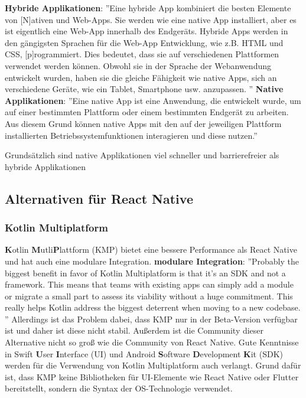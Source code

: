 \textbf{Hybride Applikationen}: ''Eine hybride App kombiniert die besten Elemente von [N]ativen und Web-Apps.
Sie werden wie eine native App installiert, aber es ist eigentlich
eine Web-App innerhalb des Endgeräts.
Hybride Apps werden in den gängigsten Sprachen für die Web-App Entwicklung, wie z.B. HTML und CSS, [p]rogrammiert. Dies bedeutet, dass sie auf verschiedenen Plattformen verwendet werden können.
Obwohl sie in der Sprache der Webanwendung entwickelt wurden, haben sie die gleiche Fähigkeit wie native Apps, sich an verschiedene Geräte, wie ein Tablet, Smartphone usw. anzupassen.
''\cite{native-vs-hybrid}
\newline
\textbf{Native Applikationen}: ''Eine native App ist eine Anwendung, die entwickelt wurde,
um auf einer bestimmten Plattform oder einem bestimmten Endgerät zu arbeiten.
Aus diesem Grund können native Apps mit den auf der jeweiligen Plattform
installierten Betriebssystemfunktionen interagieren und diese nutzen.''

\cite{native-vs-hybrid}



Grundsätzlich sind native Applikationen  viel schneller und barrierefreier als hybride Applikationen
\cite{native-vs-hybrid}



\subsection{Alternativen für React Native}

\subsubsection{Kotlin Multiplatform}
\textbf{K}otlin \textbf{M}utli\textbf{P}lattform (KMP) bietet eine bessere Performance als React Native und hat auch eine modulare Integration.
\newline
\textbf{modulare Integration}: ''Probably the biggest benefit in favor of Kotlin Multiplatform is that it’s
an SDK and not a framework. This means that teams with existing apps can
simply add a module or migrate a small part to assess its viability without
a huge commitment. This really helps Kotlin address the biggest deterrent
when moving to a new codebase.
''
\cite{kotlin-multiplatform-vs-react-native}
Allerdings ist das Problem dabei, dass KMP nur in der Beta-Version verfügbar ist und daher ist diese nicht stabil.
Außerdem  ist die Community dieser Alternative nicht so groß wie die Community von React Native.
Gute Kenntnisse in Swift \textbf{U}ser \textbf{I}nterface (UI) und Android \textbf{S}oftware \textbf{D}evelopment \textbf{K}it (SDK) werden für die Verwendung von Kotlin Multiplatform auch verlangt.
Grund dafür ist, dass KMP keine Bibliotheken für UI-Elemente wie React Native oder Flutter bereitstellt, sondern die Syntax der OS-Technologie verwendet.
\cite{kotlin-multiplatform-vs-react-native}
